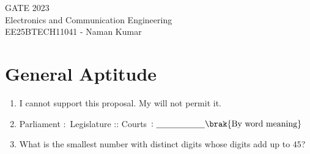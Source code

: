 \documentclass[a4paper, 11pt]{article}
\begin{document}
\begin{center}
    \huge{GATE 2023}\\
    \large{Electronics and Communication Engineering }\\
    \large{EE25BTECH11041 - Naman Kumar}
\end{center}

\section*{General Aptitude }

\begin{enumerate}
    \item I cannot support this proposal. My \underline{\hspace{2cm}} will not permit it.
    \begin{enumerate}
    \end{enumerate}
    
    \hfill{}
    
    \item Parliament $\colon$ Legislature :: Courts $\colon \underline{\hspace{2cm}} \brak{\text{By word meaning}}$
    \begin{enumerate}
    \end{enumerate}
    
    \hfill{}
    
    \item What is the smallest number with distinct digits whose digits add up to $45$?
    \begin{enumerate}
    \end{enumerate}
    

\end{enumerate}
\end{document}
